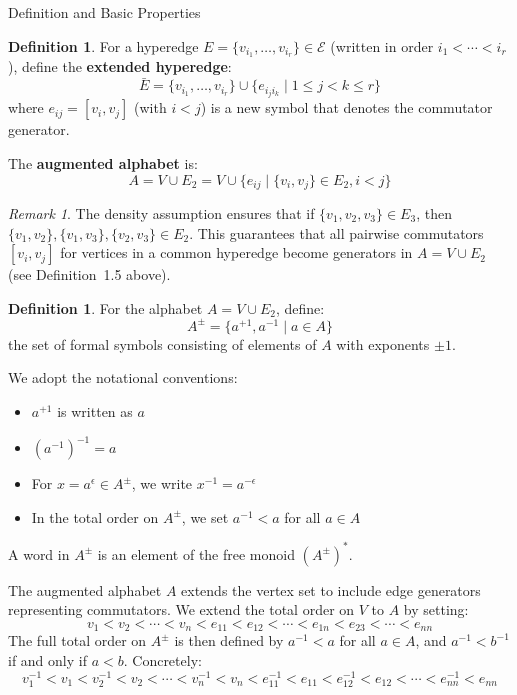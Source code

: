 \documentclass{article}
\theoremstyle{definition}
\newtheorem{definition}[theorem]{Definition}
\theoremstyle{remark}
\newtheorem{remark}[theorem]{Remark}
\theoremstyle{theorem}
\theoremstyle{definition}
\begin{document}
\begin{section}{Definition and Basic Properties}
\begin{definition}
For a hyperedge $E = \{v_{i_1}, \ldots, v_{i_r}\} \in \mathcal{E}$ (written in order $i_1 < \cdots < i_r$), define the \textbf{extended hyperedge}:
$$\bar{E} = \{v_{i_1}, \ldots, v_{i_r}\} \cup \{e_{i_j i_k} \mid 1 \leq j < k \leq r\}$$
where $e_{ij} = [v_i, v_j]$ (with $i < j$) is a new symbol that denotes the commutator generator.

The \textbf{augmented alphabet} is:
$$A = V \cup E_2 = V \cup \{e_{ij} \mid \{v_i, v_j\} \in E_2, i<j\}$$
\end{definition}

\begin{remark}
The density assumption ensures that if $\{v_1, v_2, v_3\} \in E_3$, then $\{v_1, v_2\}, \{v_1, v_3\}, \{v_2, v_3\} \in E_2$. This guarantees that all pairwise commutators $[v_i, v_j]$ for vertices in a common hyperedge become generators in $A = V \cup E_2$ (see Definition~1.5 above).
\end{remark}

\begin{definition}
For the alphabet $A = V \cup E_2$, define:
$$A^{\pm} = \{a^{+1}, a^{-1} \mid a \in A\}$$
the set of formal symbols consisting of elements of $A$ with exponents $\pm 1$. 

We adopt the notational conventions:
\begin{itemize}
    \item $a^{+1}$ is written as $a$
    \item $(a^{-1})^{-1} = a$
    \item For $x = a^\epsilon \in A^{\pm}$, we write $x^{-1} = a^{-\epsilon}$
    \item In the total order on $A^{\pm}$, we set $a^{-1}<a $ for all $a \in A$
\end{itemize}

A word in $A^{\pm}$ is an element of the free monoid $(A^{\pm})^*$.
\end{definition}

The augmented alphabet $A$ extends the vertex set to include edge generators representing commutators. We extend the total order on $V$ to $A$ by setting:
$$v_1 < v_2 < \cdots < v_n < e_{11} < e_{12} < \cdots < e_{1n} < e_{23} < \cdots < e_{nn}$$
The full total order on $A^{\pm}$ is then defined by $a^{-1} < a$ for all $a \in A$, and $a^{-1} < b^{-1}$ if and only if $a < b$. Concretely:
$$v_1^{-1} < v_1 < v_2^{-1} < v_2 < \cdots < v_n^{-1} < v_n < e_{11}^{-1} < e_{11} < e_{12}^{-1} < e_{12} < \cdots < e_{nn}^{-1} < e_{nn}$$


\end{section}
\end{document}
